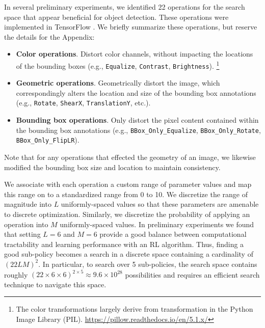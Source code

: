 \documentclass[10pt,twocolumn,letterpaper]{article}
\newcommand{\cmd}[1]{{\tt #1}}
\begin{document}
In several preliminary experiments, we identified 22 operations for the search space that appear beneficial for object detection. These operations were implemented in TensorFlow \cite{tensorflow-osdi2016}. We briefly summarize these operations, but reserve the details for the Appendix: \begin{itemize}
    \item \textbf{Color operations}. Distort color channels, without impacting the locations of the bounding boxes (e.g., \cmd{Equalize}, \cmd{Contrast}, \cmd{Brightness}). \footnote{The color transformations largely derive from transformation in the Python Image Library (PIL). \url{https://pillow.readthedocs.io/en/5.1.x/}} 
    
    \item \textbf{Geometric operations}. Geometrically distort the image, which correspondingly alters the location and size of the bounding box annotations (e.g., \cmd{Rotate}, \cmd{ShearX}, \cmd{TranslationY}, etc.).
    
    \item \textbf{Bounding box operations}. Only distort the pixel content contained within the bounding box annotations (e.g., \cmd{BBox\_Only\_Equalize}, \cmd{BBox\_Only\_Rotate}, \cmd{BBox\_Only\_FlipLR}).  
\end{itemize}

Note that for any operations that effected the geometry of an image, we likewise modified the bounding box size and location to maintain consistency.

We associate with each operation a custom range of parameter values and map this range on to a standardized range from 0 to 10.
We discretize the range of magnitude into $L$ uniformly-spaced values so that these parameters are amenable to discrete optimization. Similarly, we discretize the probability of applying an operation into $M$ uniformly-spaced values. 
In preliminary experiments we found that setting $L=6$ and $M=6$ provide a good balance between computational tractability and learning performance with an RL algorithm.
Thus, finding a good sub-policy becomes a search in a discrete space containing a cardinality of $(22LM)^2$.
In particular, to search over 5 sub-policies, the search space contains roughly $(22 \times 6 \times 6)^{2\times5} \approx 9.6\times 10^{28}$ possibilities and requires an efficient search technique to navigate this space.
\end{document}
